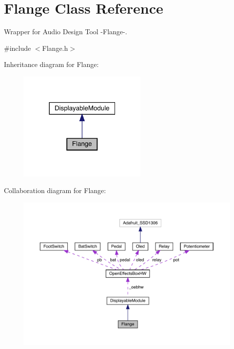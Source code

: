 \hypertarget{class_flange}{}\section{Flange Class Reference}
\label{class_flange}


Wrapper for Audio Design Tool -\/\+Flange-\/.  




{\ttfamily \#include $<$Flange.\+h$>$}



Inheritance diagram for Flange\+:
\nopagebreak
\begin{figure}[H]
\begin{center}
\leavevmode
\includegraphics[width=180pt]{class_flange__inherit__graph}
\end{center}
\end{figure}


Collaboration diagram for Flange\+:
\nopagebreak
\begin{figure}[H]
\begin{center}
\leavevmode
\includegraphics[width=350pt]{class_flange__coll__graph}
\end{center}
\end{figure}

